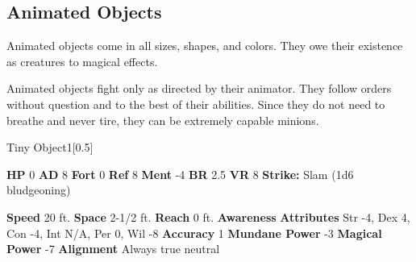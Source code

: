       
    \subsection{Animated Objects}
      
      Animated objects come in all sizes, shapes, and colors.
      They owe their existence as creatures to magical effects.
    
      Animated objects fight only as directed by their animator.
      They follow orders without question and to the best of their abilities.
      Since they do not need to breathe and never tire, they can be extremely capable minions.
    

      
  \begin{monsubsection}{Tiny Object}{1}[0.5]
    \vspace{-1em}\vspace{-1em}
    \vspace{0em}

    
    

    \begin{spellcontent}
      \begin{spelltargetinginfo}
        \pari \textbf{HP} 0 \monsep
          \textbf{AD} 8 \monsep
          \textbf{Fort} 0 \monsep
          \textbf{Ref} 8 \monsep
          \textbf{Ment} -4
        \pari \textbf{BR} 2.5 \monsep
        \textbf{VR} 8
        \pari \textbf{Strike:}
            Slam  (1d6 bludgeoning)
      \end{spelltargetinginfo}
    \end{spellcontent}
    \begin{monsterfooter}
      \pari \textbf{Speed} 20 ft. \monsep
        \textbf{Space} 2-1/2 ft. \monsep
        \textbf{Reach} 0 ft.
      \pari \textbf{Awareness} 
      \pari \textbf{Attributes}
        Str -4, Dex 4,
        Con -4, Int N/A,
        Per 0, Wil -8
      \pari \textbf{Accuracy} 1 \monsep
        \textbf{Mundane Power} -3 \monsep
      \textbf{Magical Power} -7
      \pari \textbf{Alignment} Always true neutral
    \end{monsterfooter}
  \end{monsubsection}
  
  

